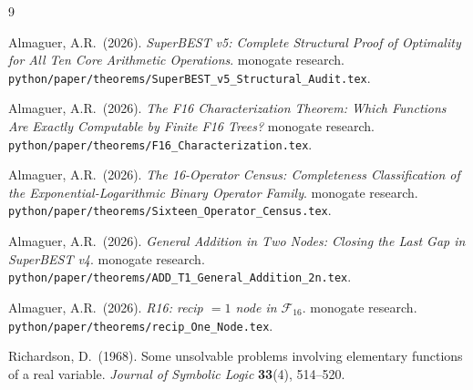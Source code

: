 \documentclass[12pt,a4paper]{article}
\theoremstyle{definition}
\theoremstyle{remark}
\begin{document}
\begin{thebibliography}{9}

Almaguer, A.R.\ (2026).
\textit{SuperBEST v5: Complete Structural Proof of Optimality for All Ten
Core Arithmetic Operations}.
monogate research.
\texttt{python/paper/theorems/SuperBEST\_v5\_Structural\_Audit.tex}.

Almaguer, A.R.\ (2026).
\textit{The F16 Characterization Theorem: Which Functions Are Exactly
Computable by Finite F16 Trees?}
monogate research.
\texttt{python/paper/theorems/F16\_Characterization.tex}.

Almaguer, A.R.\ (2026).
\textit{The 16-Operator Census: Completeness Classification of the
Exponential-Logarithmic Binary Operator Family}.
monogate research.
\texttt{python/paper/theorems/Sixteen\_Operator\_Census.tex}.

Almaguer, A.R.\ (2026).
\textit{General Addition in Two Nodes: Closing the Last Gap in SuperBEST v4}.
monogate research.
\texttt{python/paper/theorems/ADD\_T1\_General\_Addition\_2n.tex}.

Almaguer, A.R.\ (2026).
\textit{R16: recip $= 1$ node in $\mathcal{F}_{16}$}.
monogate research.
\texttt{python/paper/theorems/recip\_One\_Node.tex}.

Richardson, D.\ (1968).
Some unsolvable problems involving elementary functions of a real variable.
\textit{Journal of Symbolic Logic} \textbf{33}(4), 514--520.

\end{thebibliography}
\end{document}
